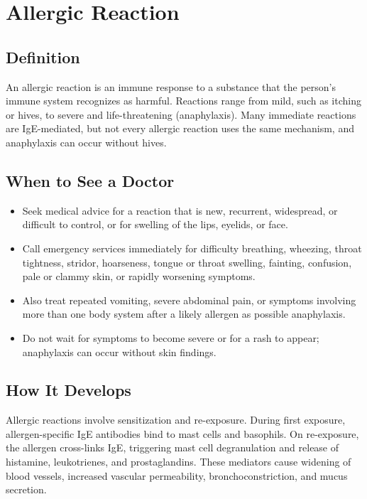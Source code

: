 \chapter{Allergic Reaction}

\section*{Definition}
An allergic reaction is an immune response to a substance that the person's immune system recognizes as harmful. Reactions range from mild, such as itching or hives, to severe and life-threatening (anaphylaxis). Many immediate reactions are IgE-mediated, but not every allergic reaction uses the same mechanism, and anaphylaxis can occur without hives.

\section*{When to See a Doctor}
\begin{itemize}
\item Seek medical advice for a reaction that is new, recurrent, widespread, or difficult to control, or for swelling of the lips, eyelids, or face.
\item Call emergency services immediately for difficulty breathing, wheezing, throat tightness, stridor, hoarseness, tongue or throat swelling, fainting, confusion, pale or clammy skin, or rapidly worsening symptoms.
\item Also treat repeated vomiting, severe abdominal pain, or symptoms involving more than one body system after a likely allergen as possible anaphylaxis.
\item Do not wait for symptoms to become severe or for a rash to appear; anaphylaxis can occur without skin findings.
\end{itemize}

\section*{How It Develops}
Allergic reactions involve sensitization and re-exposure. During first exposure, allergen-specific IgE antibodies bind to mast cells and basophils. On re-exposure, the allergen cross-links IgE, triggering mast cell degranulation and release of histamine, leukotrienes, and prostaglandins. These mediators cause widening of blood vessels, increased vascular permeability, bronchoconstriction, and mucus secretion.

